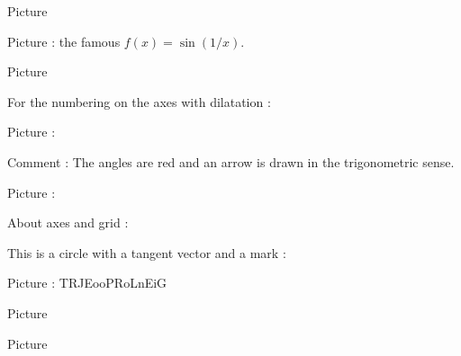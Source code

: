 \clearpage


Picture 
\begin{center}
   
\end{center}
   

\clearpage


Picture  : the famous \( f(x)=\sin(1/x)\).
\begin{center}
   
\end{center}
   

Picture 
\begin{center}
   
\end{center}
   

For the numbering on the axes with dilatation : 
\begin{center}
   
\end{center}



Picture : 
\begin{center}
   
\end{center}
Comment : The angles are red and an arrow is drawn in the trigonometric sense.


Picture : 
\begin{center}
   
\end{center}

About axes and grid : 
\begin{center}
   
\end{center}
   


This is a circle with a tangent vector and a mark :

Picture : TRJEooPRoLnEiG
\begin{center}
    
\end{center}



Picture 
\begin{center}
   
\end{center}

Picture 
\begin{center}
   
\end{center}


